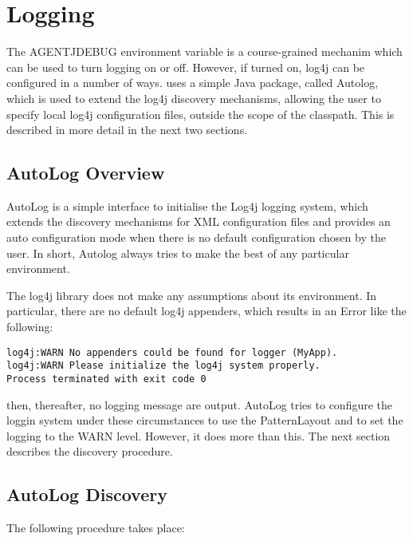\section{\agentj Logging}
\label{install:logging}

The AGENTJDEBUG environment variable is a course-grained mechanim which can be
used to turn logging on or off. However, if turned on, log4j can be configured
in a number of ways. \agentj uses a simple Java package, called Autolog, which
is used to extend the log4j discovery mechanisms, allowing the user to specify
local log4j configuration files, outside the scope of the classpath.  This is
described in more detail in the next two sections.  

\subsection{AutoLog Overview}
\label{whatis}

AutoLog is a simple interface to initialise the Log4j logging system, which
extends the discovery mechanisms for XML configuration files and
provides an auto configuration mode when there is no default configuration 
chosen by the user.  In short, Autolog always tries to make the best
of any particular environment. 


The log4j library does not make any assumptions about its 
environment. In particular, there are no default log4j appenders,
which results in an Error like the following:

\footnotesize
\begin{verbatim}
log4j:WARN No appenders could be found for logger (MyApp).
log4j:WARN Please initialize the log4j system properly.
Process terminated with exit code 0
\end{verbatim}
\normalsize

\noindent then, thereafter, no logging message are output.  AutoLog
tries to configure the loggin system under these circumstances to
use the PatternLayout and to set the logging to the WARN level.
However, it does more than this. The next section describes the
discovery procedure.


\subsection{AutoLog Discovery}
\label{whatis}

The following procedure takes place:

